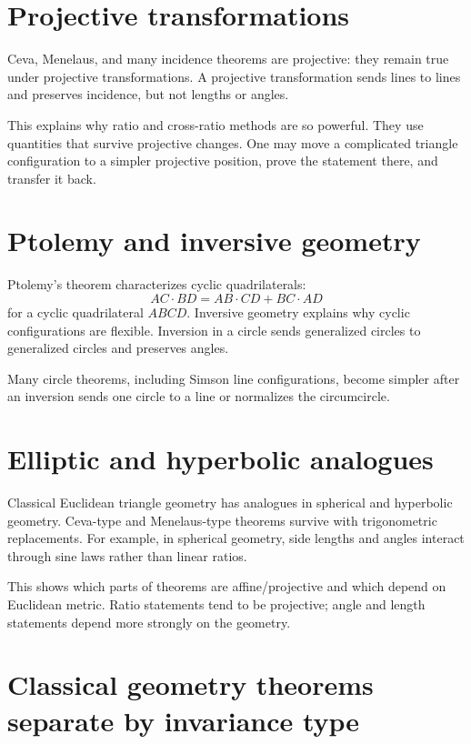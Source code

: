 \section{Projective transformations}

Ceva, Menelaus, and many incidence theorems are projective: they remain true under projective transformations.  A projective transformation sends lines to lines and preserves incidence, but not lengths or angles.

This explains why ratio and cross-ratio methods are so powerful.  They use quantities that survive projective changes.  One may move a complicated triangle configuration to a simpler projective position, prove the statement there, and transfer it back.

\section{Ptolemy and inversive geometry}

Ptolemy's theorem characterizes cyclic quadrilaterals:
\[
  AC\cdot BD=AB\cdot CD+BC\cdot AD
\]
for a cyclic quadrilateral $ABCD$.  Inversive geometry explains why cyclic configurations are flexible.  Inversion in a circle sends generalized circles to generalized circles and preserves angles.

Many circle theorems, including Simson line configurations, become simpler after an inversion sends one circle to a line or normalizes the circumcircle.

\section{Elliptic and hyperbolic analogues}

Classical Euclidean triangle geometry has analogues in spherical and hyperbolic geometry.  Ceva-type and Menelaus-type theorems survive with trigonometric replacements.  For example, in spherical geometry, side lengths and angles interact through sine laws rather than linear ratios.

This shows which parts of theorems are affine/projective and which depend on Euclidean metric.  Ratio statements tend to be projective; angle and length statements depend more strongly on the geometry.

\section{Classical geometry theorems separate by invariance type}

